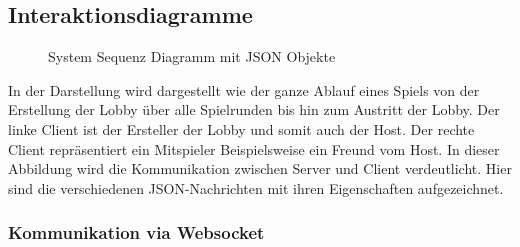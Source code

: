 \documentclass[11pt,ngerman]{article}
\begin{document}
	
    \subsection{Interaktionsdiagramme}
    \begin{figure}[H]
    	\centering
    	\caption{System Sequenz Diagramm mit JSON Objekte}
    	\label{fig:Game_SSD_with_JSON}
    \end{figure}
	In der Darstellung wird dargestellt wie der ganze Ablauf eines Spiels von der Erstellung der Lobby über alle Spielrunden bis hin zum Austritt der Lobby. Der linke Client ist der Ersteller der Lobby und somit auch der Host. Der rechte Client repräsentiert ein Mitspieler Beispielsweise ein Freund vom Host. In dieser Abbildung wird die Kommunikation zwischen Server und Client verdeutlicht. Hier sind die verschiedenen JSON-Nachrichten mit ihren Eigenschaften aufgezeichnet.


    \subsubsection{Kommunikation via Websocket}
\end{document}
